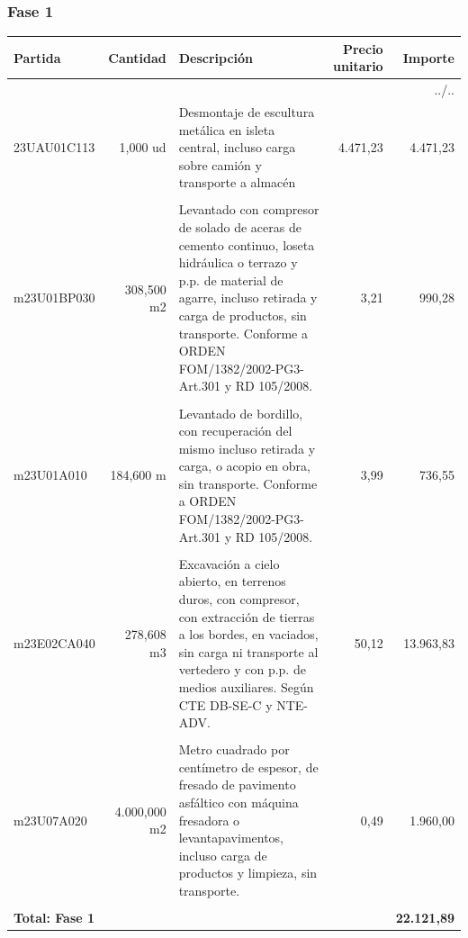 \documentclass{book}%
\begin{document}
\subsubsection{Fase 1}%
\small%
\begin{longtable}{lrlrr}%
Partida&Cantidad&Descripción&\multicolumn{1}{p{1.5cm}}{Precio unitario}&Importe\\%
\hline%
\endhead%
\multicolumn{5}{r}{../..}\\%
\endfoot%
\hline%
\endlastfoot%
23UAU01C113&     1,000 ud&\multicolumn{1}{p{5cm}}{Desmontaje de escultura metálica en isleta central, incluso carga sobre camión y transporte a almacén}&  4.471,23&4.471,23\\%
&&&&\\%
m23U01BP030&   308,500 m2&\multicolumn{1}{p{5cm}}{Levantado con compresor de solado de aceras de cemento continuo, loseta hidráulica o terrazo y p.p. de material de agarre, incluso retirada y carga de productos, sin transporte. Conforme a ORDEN FOM/1382/2002{-}PG3{-}Art.301 y RD 105/2008.}&      3,21&990,28\\%
&&&&\\%
m23U01A010&   184,600 m&\multicolumn{1}{p{5cm}}{Levantado de bordillo, con recuperación del mismo incluso retirada y carga, o acopio en obra, sin transporte. Conforme a ORDEN FOM/1382/2002{-}PG3{-}Art.301 y RD 105/2008.}&      3,99&736,55\\%
&&&&\\%
m23E02CA040&   278,608 m3&\multicolumn{1}{p{5cm}}{Excavación a cielo abierto, en terrenos duros, con compresor, con extracción de tierras a los bordes, en vaciados, sin carga ni transporte al vertedero y con p.p. de medios auxiliares. Según CTE DB{-}SE{-}C y NTE{-}ADV.}&     50,12&13.963,83\\%
&&&&\\%
m23U07A020& 4.000,000 m2&\multicolumn{1}{p{5cm}}{Metro cuadrado por centímetro de espesor, de fresado de pavimento asfáltico con máquina fresadora o levantapavimentos, incluso carga de productos y limpieza, sin transporte.}&      0,49&1.960,00\\%
&&&&\\%
\multicolumn{4}{p{8cm}}{\textbf{Total: Fase 1}}&\textbf{22.121,89}\\%
\end{longtable}%
\normalsize

%
\end{document}
